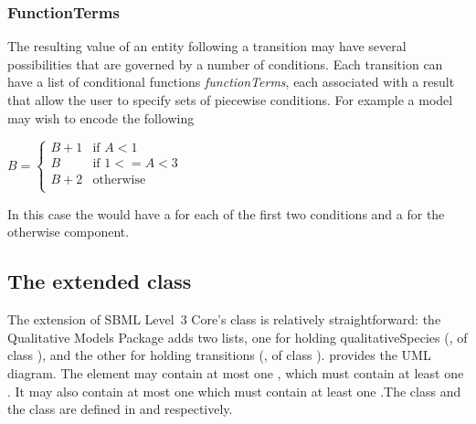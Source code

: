 \subsubsection{FunctionTerms}

The resulting value of an entity following a transition may have several possibilities that are governed by a number of conditions. Each transition can have a list of conditional functions \emph{functionTerms}, each associated with a result that allow the user to specify sets of piecewise conditions. For example a model may wish to encode the following


$B = \left\{ \begin{array}{cc}
      B+1 & \mbox{if $A < 1$} \\
      B & \mbox{if $1 <= A < 3$} \\
     B + 2 & \mbox{otherwise}  \\
     \end{array}
\right.
$

In this case the \Transition would have a \FunctionTerm for each of the first two conditions and a \DefaultTerm for the otherwise component.





\subsection{The extended  class}
\label{model-class}

The extension of SBML Level~3 Core's \Model class is relatively
straightforward: the Qualitative Models Package adds two lists,
one for holding qualitativeSpecies (, of class
\ListOfQualitativeSpecies), and the other for holding transitions (,
of class \ListOfTransitions).   provides the UML
diagram.  The  element may contain at most one \ListOfQualitativeSpecies, which must contain at least one \QualitativeSpecies. It may also contain at most one \ListOfTransitions which must contain at least one \Transition.The \QualitativeSpecies class and
the \Transition  class are defined in  and  respectively.

